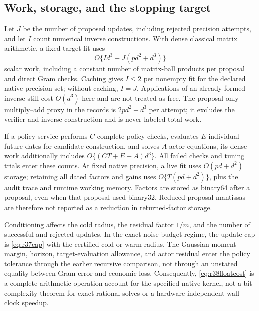 \subsection{Work, storage, and the stopping target}
Let $J$ be the number of proposed updates, including rejected precision
attempts, and let $I$ count numerical inverse constructions. With dense
classical matrix arithmetic, a fixed-target fit uses
\begin{equation}\label{eq:r38floatcost}
 O\{Id^3+J(pd^2+d^3)\}
\end{equation}
scalar work, including a constant number of matrix-ball products per
proposal and direct Gram checks. Caching gives $I\leq2$ per nonempty fit
for the declared native precision set; without caching, $I=J$.
Applications of an already formed inverse still cost $O(d^3)$ here and
are not treated as free. The proposal-only multiply--add proxy in the
records is $2pd^2+d^3$ per attempt; it excludes the verifier and inverse
construction and is never labeled total work.

If a policy service performs $C$ complete-policy checks, evaluates $E$
individual future dates for candidate construction, and solves $A$ actor
equations, its dense work additionally includes
$O\{(CT+E+A)d^3\}$. All failed checks and tuning trials enter these counts.
At fixed native precision, a live fit uses $O(pd+d^2)$ storage; retaining
all dated factors and gains uses $O\{T(pd+d^2)\}$, plus the audit trace and
runtime working memory. Factors are stored as binary64 after a proposal,
even when that proposal used binary32. Reduced proposal mantissas are
therefore not reported as a reduction in returned-factor storage.

Conditioning affects the cold radius, the residual factor $1/m$, and the
number of successful and rejected updates. In the exact noise-budget
regime, the update cap is \eqref{eq:r37cap} with the certified cold or warm
radius. The Gaussian moment margin, horizon, target-evaluation allowance,
and actor residual enter the policy tolerance through the earlier
recursive comparison, not through an unstated equality between Gram error
and economic loss. Consequently, \eqref{eq:r38floatcost} is a complete
arithmetic-operation account for the specified native kernel, not a
bit-complexity theorem for exact rational solves or a hardware-independent
wall-clock speedup.
